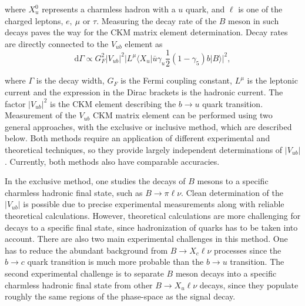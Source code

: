 where $X_u^0$ represents a charmless hadron with a $u$ quark, and $\ell$ is one of the charged leptons, $e,~\mu$ or $\tau$. Measuring the decay rate of the $B$ meson in such decays paves the way for the CKM matrix element determination. Decay rates are directly connected to the $V_{ub}$ element as
\begin{equation}
\mathrm{d} \Gamma \propto G_F^2 \vert V_{ub} \vert ^2 \vert L^\mu \langle X_u \vert \bar u \gamma_u \frac{1}{2} (1-\gamma_5) b \vert B \rangle \vert ^2,
\end{equation}

where $\Gamma$ is the decay width, $G_F$ is the Fermi coupling constant, $L^\mu$ is the leptonic current and the expression in the Dirac brackets is the hadronic current. The factor $\vert V_{ub} \vert ^2$ is the CKM element describing the $b \to u$ quark transition. Measurement of the $V_{ub}$ CKM matrix element can be performed using two general approaches, with the exclusive or inclusive method, which are described below. Both methods require an application of different experimental and theoretical techniques, so they provide largely independent determinations of $\vert V_{ub} \vert$. Currently, both methods also have comparable accuracies. 

In the exclusive method, one studies the decays of $B$ mesons to a specific charmless hadronic final state, such as $B \to \pi \ell \nu$. Clean determination of the $\vert V_{ub}\vert$ is possible due to precise experimental measurements along with reliable theoretical calculations. However, theoretical calculations are more challenging for decays to a specific final state, since hadronization of quarks has to be taken into account. There are also two main experimental challenges in this method. One has to reduce the abundant background from $B \to X_c \ell \nu$ processes since the $b \to c$ quark transition is much more probable than the $b \to u$ transition. The second experimental challenge is to separate $B$ meson decays into a specific charmless hadronic final state from other $B \to X_u \ell \nu$ decays, since they populate roughly the same regions of the phase-space as the signal decay.


